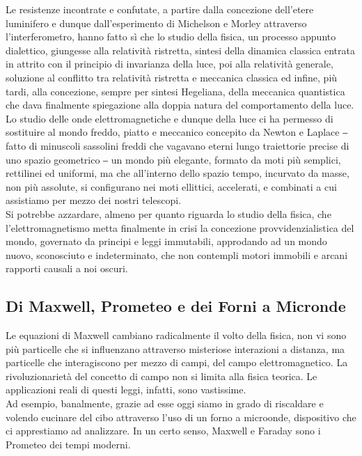 \documentclass{article}
\begin{document}
Le resistenze incontrate e confutate, a partire dalla concezione dell’etere luminifero e dunque dall’esperimento di Michelson e Morley attraverso l'interferometro, hanno fatto sì che lo studio della fisica, un processo appunto dialettico, giungesse alla relatività ristretta, sintesi della dinamica classica entrata in attrito con il principio di invarianza della luce, poi alla relatività generale, soluzione al conflitto tra relatività ristretta e meccanica classica ed infine, più tardi, alla concezione, sempre per sintesi Hegeliana, della meccanica quantistica che dava finalmente spiegazione alla doppia natura del comportamento della luce.
\\

Lo studio delle onde elettromagnetiche e dunque della luce ci ha permesso di sostituire al mondo freddo, piatto e meccanico concepito da Newton e Laplace ‒ fatto di  minuscoli sassolini freddi che vagavano eterni lungo traiettorie precise di uno spazio geometrico ‒ un mondo più elegante, formato da moti più semplici, rettilinei  ed uniformi, ma che all’interno dello spazio tempo, incurvato da masse, non più assolute, si configurano nei moti ellittici, accelerati, e combinati a cui assistiamo per mezzo dei nostri telescopi. 
\\ %

Si potrebbe azzardare, almeno per quanto riguarda lo studio della fisica, che l’elettromagnetismo metta finalmente in crisi la concezione provvidenzialistica del mondo,  governato da principi e leggi immutabili, approdando ad un mondo nuovo, sconosciuto e indeterminato, che non contempli motori immobili e arcani rapporti causali a noi oscuri. 

\newpage
\subsection{Di Maxwell, Prometeo e dei Forni a Micronde}
Le equazioni di Maxwell cambiano radicalmente il volto della fisica, non vi sono più particelle che si influenzano attraverso misteriose interazioni a distanza, ma particelle che interagiscono per mezzo di campi, del campo elettromagnetico. La rivoluzionarietà del concetto di campo non si limita alla fisica teorica. Le applicazioni reali di questi leggi, infatti, sono vastissime. 
\\

Ad esempio, banalmente, grazie ad esse oggi siamo in grado di riscaldare e volendo cucinare del cibo attraverso l’uso di un forno a microonde, dispositivo che ci apprestiamo ad analizzare. In un certo senso, Maxwell e Faraday sono i Prometeo dei tempi moderni.
\end{document}
